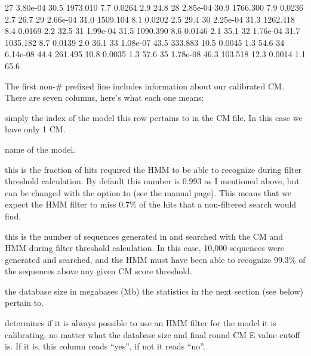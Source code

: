 \begin{sreoutput}
          27    3.80e-04    30.5    1973.010     7.7  0.0264      2.9     24.8
          28    2.85e-04    30.9    1766.300     7.9  0.0236      2.7     26.7
          29    2.66e-04    31.0    1509.104     8.1  0.0202      2.5     29.4
          30    2.25e-04    31.3    1262.418     8.4  0.0169      2.2     32.5
          31    1.99e-04    31.5    1090.390     8.6  0.0146      2.1     35.1
          32    1.76e-04    31.7    1035.182     8.7  0.0139      2.0     36.1
          33    1.08e-07    43.5     333.883    10.5  0.0045      1.3     54.6
          34    6.14e-08    44.4     261.495    10.8  0.0035      1.3     57.6
          35    1.78e-08    46.3     103.518    12.3  0.0014      1.1     65.6
\end{sreoutput}

The first non-\# prefixed line includes information about our
calibrated CM. There are seven columns, here's what each one
means:

\begin{wideitem}

\item[\emprog{idx}] simply the index of the model this row pertains to in
  the CM file. In this case we have only 1 CM.

\item[\emprog{name}] name of the model.

\item[\emprog{F}] this is the fraction of hits 
  required the HMM to be able to recognize during filter threshold
  calculation. By default this number is $0.993$ as I mentioned above,
  but can be changed with the  option to 
  (see the manual page). This means that we expect the HMM filter to miss
  $0.7\%$ of the hits that a non-filtered search would find.

\item[\emprog{nseq}] this is the number of sequences generated in 
  and searched with the CM and HMM during filter threshold
  calculation. In this case, 10,000 sequences were generated and
  searched, and the HMM must have been able to recognize $99.3\%$ of the
  sequences above any given CM score threshold. 

\item[\emprog{db (Mb)}] the database size in megabases (Mb) the
  statistics in the next section (see below) pertain to.

\item[\emprog{always?}]  determines if it is always
  possible to use an HMM filter for the model it is calibrating, no
  matter what the database size and final round CM E value cutoff
  is. If it is, this column reads ``yes'', if not it reads ``no''.

\end{wideitem}

